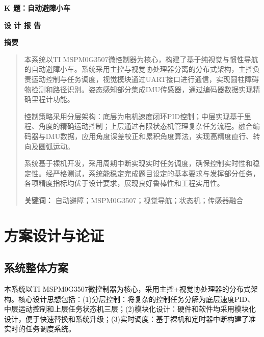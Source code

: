 \documentclass[UTF8]{ctexart}
\begin{document}
	\thispagestyle{empty}
	\vspace*{1cm}
	\begin{center}
		{\huge \bfseries K 题：自动避障小车}
		\vspace{0.5cm}
		
		{\Large \bfseries 设 计 报 告}
		
		\vspace{1cm}
		
		{\Large \bfseries 摘\quad 要}
	\end{center}
	\begin{quote}
		\noindent
		本系统以TI MSPM0G3507微控制器为核心，构建了基于纯视觉与惯性导航的自动避障小车。系统采用主控与视觉协处理器分离的分布式架构，主控负责运动控制与任务调度，视觉模块通过UART接口进行通信，实现圆柱障碍物检测和路径识别。姿态感知部分集成IMU传感器，通过编码器数据实现精确里程计功能。
		
		控制策略采用分层架构：底层为电机速度闭环PID控制；中层实现基于里程、角度的精确运动控制；上层通过有限状态机管理复杂任务流程。融合编码器与IMU数据，应用角度误差校正和累积角度算法，实现高精度直行、转向及圆弧运动。
		
		系统基于裸机开发，采用周期中断实现实时任务调度，确保控制实时性和稳定性。经严格测试，系统能稳定完成题目设定的基本要求与发挥部分任务，各项精度指标均优于设计要求，展现良好鲁棒性和工程实用性。
		
		\vspace{0.5cm}
		\noindent
		\textbf{关键词：} 自动避障；MSPM0G3507；视觉导航；状态机；传感器融合
	\end{quote}
	
	\newpage
	\setcounter{page}{1} %
	
	
	\section{方案设计与论证}
	
	\subsection{系统整体方案}
	本系统以TI MSPM0G3507微控制器为核心，采用主控+视觉协处理器的分布式架构。核心设计思想包括：(1)分层控制：将复杂的控制任务分解为底层速度PID、中层运动控制和上层任务状态机三层；(2)模块化设计：硬件和软件均采用模块化设计，便于快速替换和系统升级；(3)实时调度：基于裸机和定时器中断构建了准实时的任务调度系统。
	
\end{document}
